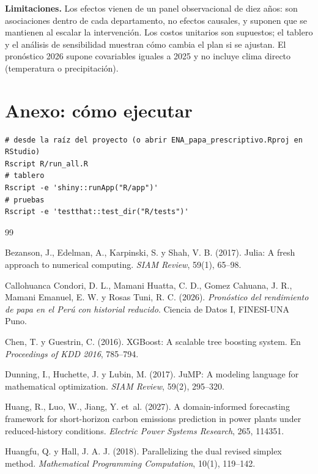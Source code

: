 \documentclass[letterpaper]{report}
\begin{document}
\begin{article}
\textbf{Limitaciones.} Los efectos vienen de un panel observacional de diez años: son asociaciones dentro de cada departamento, no efectos causales, y suponen que se mantienen al escalar la intervención. Los costos unitarios son supuestos; el tablero y el análisis de sensibilidad muestran cómo cambia el plan si se ajustan. El pronóstico 2026 supone covariables iguales a 2025 y no incluye clima directo (temperatura o precipitación).

\section{Anexo: cómo ejecutar}
\begin{Verbatim}[fontsize=\scriptsize, frame=single, framesep=2mm, label={\small Comandos}]
# desde la raíz del proyecto (o abrir ENA_papa_prescriptivo.Rproj en RStudio)
Rscript R/run_all.R
# tablero
Rscript -e 'shiny::runApp("R/app")'
# pruebas
Rscript -e 'testthat::test_dir("R/tests")'
\end{Verbatim}

\begin{thebibliography}{99}

 Bezanson, J., Edelman, A., Karpinski, S. y Shah, V. B. (2017). Julia: A fresh approach to numerical computing. \emph{SIAM Review}, 59(1), 65--98.

 Callohuanca Condori, D. L., Mamani Huatta, C. D., Gomez Cahuana, J. R., Mamani Emanuel, E. W. y Rosas Tuni, R. C. (2026). \emph{Pronóstico del rendimiento de papa en el Perú con historial reducido}. Ciencia de Datos I, FINESI-UNA Puno.

 Chen, T. y Guestrin, C. (2016). XGBoost: A scalable tree boosting system. En \emph{Proceedings of KDD 2016}, 785--794.

 Dunning, I., Huchette, J. y Lubin, M. (2017). JuMP: A modeling language for mathematical optimization. \emph{SIAM Review}, 59(2), 295--320.

 Huang, R., Luo, W., Jiang, Y. et~al. (2027). A domain-informed forecasting framework for short-horizon carbon emissions prediction in power plants under reduced-history conditions. \emph{Electric Power Systems Research}, 265, 114351.

 Huangfu, Q. y Hall, J. A. J. (2018). Parallelizing the dual revised simplex method. \emph{Mathematical Programming Computation}, 10(1), 119--142.


\end{thebibliography}
\end{article}
\end{document}
